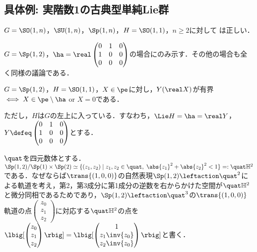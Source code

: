 \subsection{具体例: 実階数1の古典型単純Lie群}
\begin{prop}\label{prop:classical-rank-one}
  $G = \SO(1,n)$，$ \SU(1, n)$，$\Sp(1,n) $，$H = \SO(1,1) $，$n\geq 2$に対して は正しい．
\end{prop}

$G = \Sp(1,2) $，$\ha = \real \begin{pmatrix}
    0 & 1 & 0 \\
    1 & 0 & 0\\
    0 & 0 & 0
  \end{pmatrix}$の場合にのみ示す．その他の場合も全く同様の議論である．
\begin{prop}\label{prop:1127-main}
  $G = \Sp(1,2) $，$H = \SO(1,1)$，$X\in \pe$に対し，$Y(\real X) $が有界$\iff X\in \pe\setminus \ha  $ or $X = 0$である．
\end{prop}

ただし，$H$は$G$の左上に入っている．すなわち，$\Lie H = \ha = \real Y $，$Y\defeq \begin{pmatrix}
  0 & 1 & 0 \\
  1 & 0 & 0\\
  0 & 0 & 0
\end{pmatrix}$とする．

\begin{nttdef}
  
  $\quat$を四元数体とする．$\Sp(1,2)/\Sp(1)\times \Sp(2) \simeq \{(z_1, z_2)\mid z_1,z_2\in \quat ,\; \abs{z_1}^2 + \abs{z_2}^2   < 1 \} =: \quat\mathbb{H}^2 $である．なぜならば$\trans{(1,0,0)} $の自然表現$\Sp(1,2)\leftaction \quat^2 $による軌道を考え，第2，第3成分に第1成分の逆数を右からかけた空間が$\quat\mathbb{H}^2$と微分同相であるためであり，$\Sp(1,2)\leftaction \quat^3 $の$\trans{(1,0,0)} $軌道の点$
  \begin{pmatrix}
    z_0 \\ z_1 \\ z_2 
  \end{pmatrix}
  $に対応する$\quat\mathbb{H}^2$の点を$
  \lbig[ \begin{pmatrix}
    z_0 \\ z_1 \\ z_2 
  \end{pmatrix}\rbig] = \lbig[ \begin{pmatrix}
    1 \\ z_1\inv{z_0} \\ z_2\inv{z_0} 
  \end{pmatrix}\rbig] 
  $と書く．
\end{nttdef}

